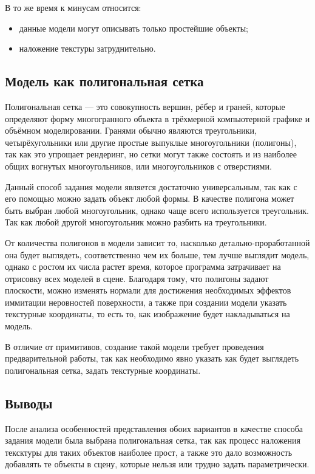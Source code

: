 \documentclass[12pt,a4paper,oneside]{report}
\begin{document}
	В то же время к минусам относится:
	\begin{itemize}
		\item данные модели могут описывать только простейшие объекты;
		\item наложение текстуры затруднительно.
	\end{itemize}

	\subsection{Модель как полигональная сетка}
	 \quad Полигональная сетка — это совокупность вершин, рёбер и граней, которые определяют форму многогранного объекта в трёхмерной компьютерной графике и объёмном моделировании. Гранями обычно являются треугольники, четырёхугольники или другие простые выпуклые многоугольники (полигоны), так как это упрощает рендеринг, но сетки могут также состоять и из наиболее общих вогнутых многоугольников, или многоугольников с отверстиями.
	 
	 Данный способ задания модели является достаточно универсальным, так как с его помощью можно задать объект любой формы. В качестве полигона может быть выбран любой многоугольник, однако чаще всего используется треугольник. Так как любой другой многоугольник можно разбить на треугольники.
	
	 От количества полигонов в модели зависит то, насколько детально-проработанной она будет выглядеть, соответственно чем их больше, тем лучше выглядит модель, однако с ростом их числа растет время, которое программа затрачивает на отрисовку всех моделей в сцене. Благодаря тому, что полигоны задают плоскости, можно изменять нормали для достижения необходимых эффектов иммитации неровностей поверхности, а также при создании модели указать текстурные координаты, то есть то, как изображение будет накладываться на модель.
	
	 В отличие от примитивов, создание такой модели требует проведения предварительной работы, так как необходимо явно указать как будет выглядеть полигональная сетка, задать текстурные координаты.
	
	\subsection{Выводы}
	 \quad После анализа особенностей представления обоих вариантов в качестве способа задания модели была выбрана полигональная сетка, так как процесс наложения тексктуры для таких объектов наиболее прост, а также это дало возможность добавлять те объекты в сцену, которые нельзя или трудно задать параметрически.
	
\end{document}
